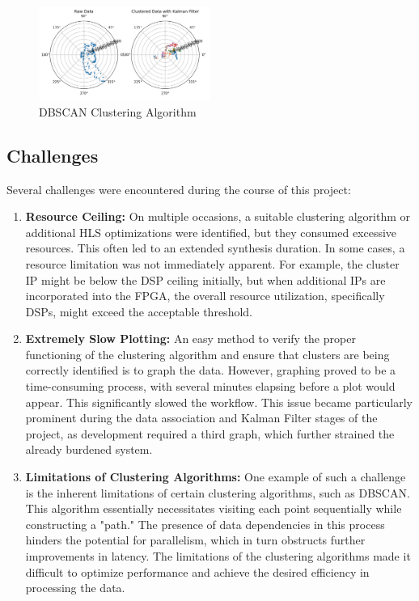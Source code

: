 \documentclass[journal]{IEEEtran} %
\begin{document}
\begin{figure}[h]
  \centering
  \includegraphics[width=0.5\textwidth]{kalmanFilter.PNG}
  \caption{DBSCAN Clustering Algorithm}
  \label{fig:kalmanFilter}
\end{figure}

\subsection{Challenges}
Several challenges were encountered during the course of this project:

\begin{enumerate}
\item \textbf{Resource Ceiling:}
On multiple occasions, a suitable clustering algorithm or additional HLS optimizations were identified, but they consumed excessive resources. This often led to an extended synthesis duration. In some cases, a resource limitation was not immediately apparent. For example, the cluster IP might be below the DSP ceiling initially, but when additional IPs are incorporated into the FPGA, the overall resource utilization, specifically DSPs, might exceed the acceptable threshold.

\item \textbf{Extremely Slow Plotting:}
An easy method to verify the proper functioning of the clustering algorithm and ensure that clusters are being correctly identified is to graph the data. However, graphing proved to be a time-consuming process, with several minutes elapsing before a plot would appear. This significantly slowed the workflow. This issue became particularly prominent during the data association and Kalman Filter stages of the project, as development required a third graph, which further strained the already burdened system.

\item \textbf{Limitations of Clustering Algorithms:}
One example of such a challenge is the inherent limitations of certain clustering algorithms, such as DBSCAN. This algorithm essentially necessitates visiting each point sequentially while constructing a "path." The presence of data dependencies in this process hinders the potential for parallelism, which in turn obstructs further improvements in latency. The limitations of the clustering algorithms made it difficult to optimize performance and achieve the desired efficiency in processing the data.

\end{enumerate}
\end{document}

